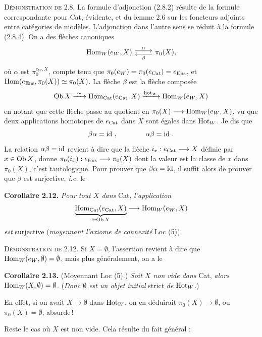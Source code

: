 \textsc{Démonstration de} 2.8. La formule d'adjonction (2.8.2) résulte de la formule correspondante pour Cat, évidente, et du lemme 2.6 sur les foncteurs adjoints entre catégories de modèles. L'adjonction dans l'autre sens se réduit à la formule (2.8.4). On a des flèches canoniques
\[
\begin{tikzcd}
\Hom_W(e_W,X) \arrow[r,shift left,"\alpha"] & \pi_0(X), \arrow[l,shift left,"\beta"]
\end{tikzcd}
\]
où $\alpha$ est $\pi_0^{e_W,X}$, compte tenu que $\pi_0(e_W)=\pi_0(e_{\mathrm{Cat}})=e_{\mathrm{Ens}}$, et $\operatorname{Hom}(e_{\mathrm{Ens}},\pi_0(X))\simeq\pi_0(X)$. La flèche $\beta$ est la flèche composée
\[
\Ob X\xrightarrow{\ \sim\ }\Hom_{\Cat}(e_{\Cat},X)\xrightarrow{\mathrm{hot}_W}\Hom_W(e_W,X)
\]
en notant que cette flèche passe au quotient en $\pi_0(X)\longrightarrow\operatorname{Hom}_W(e_W,X)$, vu que deux applications homotopes de $e_{\mathrm{Cat}}$ dans $X$ sont égales dans $\mathrm{Hot}_W$. Je dis que
\[
\beta\alpha=\mathrm{id}\ ,\qquad\qquad \alpha\beta=\mathrm{id}\ .
\]
La relation $\alpha\beta=\mathrm{id}$ revient à dire que la flèche $i_x : e_{\mathrm{Cat}}\longrightarrow X$ définie par $x\in\mathrm{Ob}\, X$, donne $\pi_0(i_x) : e_{\mathrm{Ens}}\longrightarrow\pi_0(X)$ dont la valeur est la classe de $x$ dans $\pi_0(X)$, c'est tautologique. Pour prouver que $\beta\alpha=\mathrm{id}$, il suffit alors de prouver que $\beta$ est surjective, \textit{i.e.} le

\textbf{Corollaire 2.12.} \textit{Pour tout $X$ dans} Cat, \textit{l'application}
\[
\underbrace{\operatorname{Hom}_{\mathrm{Cat}}(e_{\mathrm{Cat}},X)}_{\simeq\mathrm{Ob}\, X}\longrightarrow\operatorname{Hom}_W(e_W,X)
\]
\textit{est} surjective (\textit{moyennant l'axiome de connexité} Loc (5)).

\textsc{Démonstration de} 2.12. Si $X=\emptyset$, l'assertion revient à dire que $\operatorname{Hom}_W(e_W,\emptyset)=\emptyset$, mais plus généralement, on a le

\textbf{Corollaire 2.13.} (Moyennant Loc (5).) \textit{Soit $X$ non vide dans} Cat, \textit{alors} $\operatorname{Hom}_W(X,\emptyset)=\emptyset$. (\textit{Donc $\emptyset$ est un objet initial} strict \textit{de} $\mathrm{Hot}_W$.)

En effet, si on avait $X\longrightarrow\emptyset$ dans $\mathrm{Hot}_W$,
on en déduirait $\pi_0(X)\longrightarrow\emptyset$, ou $\pi_0(X)=\emptyset$, absurde\,!

Reste le cas où $X$ est non vide. Cela résulte du fait général :

